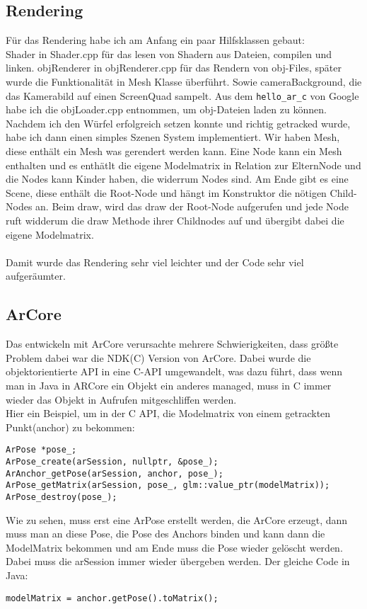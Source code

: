 \subsection{Rendering}
Für das Rendering habe ich am Anfang ein paar Hilfsklassen gebaut:\\
Shader in Shader.cpp für das lesen von Shadern aus Dateien, compilen und linken.
objRenderer in objRenderer.cpp für das Rendern von obj-Files, später wurde die
Funktionalität in Mesh Klasse überführt.
Sowie cameraBackground, die das Kamerabild auf einen ScreenQuad sampelt.
Aus dem \verb|hello_ar_c| von Google habe ich die objLoader.cpp entnommen, um obj-Dateien
laden zu können.
Nachdem ich den Würfel erfolgreich setzen konnte und richtig getracked wurde, habe ich
dann einen simples Szenen System implementiert.
Wir haben Mesh, diese enthält ein Mesh was gerendert werden kann.
Eine Node kann ein Mesh enthalten und es enthätlt die eigene Modelmatrix in Relation zur
ElternNode und die Nodes kann Kinder haben, die widerrum Nodes sind.
Am Ende gibt es eine Scene, diese enthält die Root-Node und hängt im Konstruktor die nötigen
Child-Nodes an. Beim draw, wird das draw der Root-Node aufgerufen und jede Node ruft widderum
die draw Methode ihrer Childnodes auf und übergibt dabei die eigene Modelmatrix.
\\ \\
Damit wurde das Rendering sehr viel leichter und der Code sehr viel aufgeräumter.

\subsection{ArCore}
Das entwickeln mit ArCore verursachte mehrere Schwierigkeiten, dass größte Problem dabei war
die NDK(C) Version von ArCore. Dabei wurde die objektorientierte API in eine C-API
umgewandelt, was dazu führt, dass wenn man in Java in ARCore ein Objekt ein anderes managed,
muss in C immer wieder das Objekt in Aufrufen mitgeschliffen werden.
\\
Hier ein Beispiel, um in der C API, die Modelmatrix von einem getrackten Punkt(anchor) zu bekommen:
\begin{verbatim}
ArPose *pose_;
ArPose_create(arSession, nullptr, &pose_);
ArAnchor_getPose(arSession, anchor, pose_);
ArPose_getMatrix(arSession, pose_, glm::value_ptr(modelMatrix));
ArPose_destroy(pose_);
\end{verbatim}
Wie zu sehen, muss erst eine ArPose erstellt werden, die ArCore erzeugt, dann muss man an diese Pose, die Pose des Anchors binden und kann dann die ModelMatrix bekommen und am Ende muss die Pose wieder gelöscht werden. Dabei muss die arSession immer wieder übergeben werden.
Der gleiche Code in Java:
\begin{verbatim}
modelMatrix = anchor.getPose().toMatrix();
\end{verbatim}

